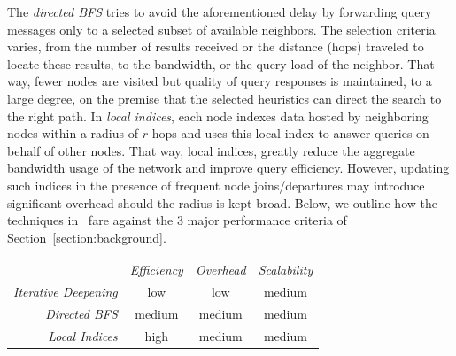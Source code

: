 The \emph{directed BFS}
tries to avoid the aforementioned delay by forwarding 
query messages only to a selected subset of available neighbors. The selection
criteria varies, from the number of results received or the distance (hops)
traveled to locate these results, to the bandwidth, or the
query load of the neighbor. That way, fewer nodes are visited but quality of
query responses is maintained, to a large degree, on the premise that the
selected heuristics can direct the search to the right path.
%
In \emph{local indices},
each node indexes data hosted by neighboring nodes within a radius of $r$ hops
and uses this local index to answer queries on behalf of other nodes.
That way, local indices,
greatly reduce the aggregate bandwidth usage of the network and 
improve query efficiency. However, updating such indices in 
the presence of frequent node joins/departures 
may introduce significant overhead should the radius is kept broad.
Below, we outline how the techniques in~\cite{YG-M2002}
fare against the $3$ major performance criteria 
of Section~\ref{section:background}.

\begin{center}
{\footnotesize
\begin{tabular}{rccc}
\multicolumn{1}{r}{} &
\multicolumn{1}{c}{\emph{Efficiency}} &
\multicolumn{1}{c}{\emph{Overhead}} &
\multicolumn{1}{c}{\emph{Scalability}}
\\
\cline{2-4}
\emph{Iterative Deepening} &
low &
low &
% 
medium \\
\emph{Directed BFS} &
medium &
medium &
medium \\
\emph{Local Indices} &
high &
medium &
medium \\
\end{tabular}
}
\end{center}


